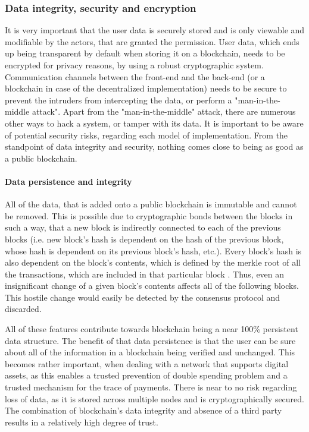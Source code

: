 \subsubsection{Data integrity, security and encryption} \label{section:analysisencryption}
It is very important that the user data is securely stored and is only viewable and modifiable by the actors, that are granted the permission. User data, which ends up being transparent by default when storing it on a blockchain, needs to be encrypted for privacy reasons, by using a robust cryptographic system. Communication channels between the front-end and the back-end (or a blockchain in case of the decentralized implementation) needs to be secure to prevent the intruders from intercepting the data, or perform a "man-in-the-middle attack". Apart from the "man-in-the-middle" attack, there are numerous other ways to hack a system, or tamper with its data. It is important to be aware of potential security risks, regarding each model of implementation. From the standpoint of data integrity and security, nothing comes close to being as good as a public blockchain.

\paragraph{Data persistence and integrity}
All of the data, that is added onto a public blockchain is immutable and cannot be removed. This is possible due to cryptographic bonds between the blocks in such a way, that a new block is indirectly connected to each of the previous blocks (i.e. new block's hash is dependent on the hash of the previous block, whose hash is dependent on its previous block's hash, etc.). Every block's hash is also dependent on the block's contents, which is defined by the merkle root of all the transactions, which are included in that particular block \citep{merkle}. Thus, even an insignificant change of a given block's contents affects all of the following blocks. This hostile change would easily be detected by the consensus protocol and discarded.

All of these features contribute towards blockchain being a near 100\% persistent data structure. The benefit of that data persistence is that the user can be sure about all of the information in a blockchain being verified and unchanged. This becomes rather important, when dealing with a network that supports digital assets, as this enables a trusted prevention of double spending problem and a trusted mechanism for the trace of payments. There is near to no risk regarding loss of data, as it is stored across multiple nodes and is cryptographically secured. The combination of blockchain's data integrity and absence of a third party results in a relatively high degree of trust.

